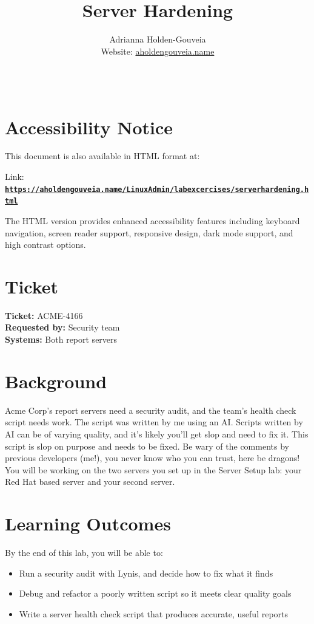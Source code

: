 \documentclass[12pt]{article}
\title{Server Hardening}
\author{
        Adrianna Holden-Gouveia \\
        Website: \href{https://aholdengouveia.name}{aholdengouveia.name}\\ 
        \date{\vspace{-5ex}}
        \faGithub {: aholdengouveia} \\
        }
\begin{document}
    

\maketitle



\section*{Accessibility Notice}
This document is also available in HTML format at:

Link: \href{https://aholdengouveia.name/LinuxAdmin/labexcercises/serverhardening.html}{\textbf{\nolinkurl{https://aholdengouveia.name/LinuxAdmin/labexcercises/serverhardening.html}}}

The HTML version provides enhanced accessibility features including keyboard navigation, screen reader support, responsive design, dark mode support, and high contrast options.


\section*{Ticket}
\noindent\textbf{Ticket:} ACME-4166\\
\textbf{Requested by:} Security team\\
\textbf{Systems:} Both report servers

\section*{Background}
Acme Corp's report servers need a security audit, and the team's health check script needs work. The script was written by me using an AI. Scripts written by AI can be of varying quality, and it's likely you'll get slop and need to fix it. This script is slop on purpose and needs to be fixed. Be wary of the comments by previous developers (me!), you never know who you can trust, here be dragons! You will be working on the two servers you set up in the Server Setup lab: your Red Hat based server and your second server.

\section*{Learning Outcomes}
By the end of this lab, you will be able to:
\begin{itemize}
    \item Run a security audit with Lynis, and decide how to fix what it finds
    \item Debug and refactor a poorly written script so it meets clear quality goals
    \item Write a server health check script that produces accurate, useful reports
\end{itemize}
\end{document}
